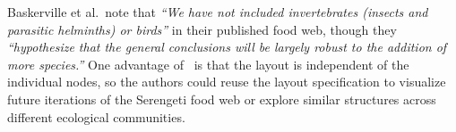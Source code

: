 
Baskerville et al.\ note that \emph{``We have not included invertebrates
  (insects and parasitic helminths) or birds''} in their published food
web, though they \emph{``hypothesize that the general conclusions will be
  largely robust to the addition of more species.''} One advantage of
\projectname~is that the layout is independent of the individual nodes, so
the authors could reuse the layout specification to visualize future iterations
of the Serengeti food web or explore similar structures across different
ecological communities.
